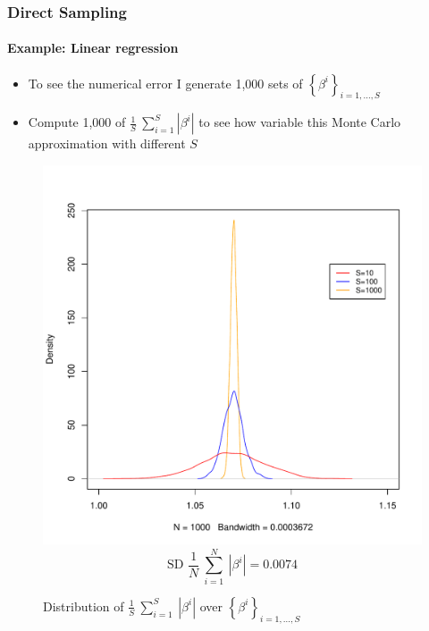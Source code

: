 \documentclass[
  shownotes,
  xcolor={svgnames},
  hyperref={colorlinks,citecolor=DarkBlue,linkcolor=DarkRed,urlcolor=DarkBlue}
  , aspectratio=169]{beamer}
\begin{document}
\begin{frame}[fragile]
\frametitle{Direct Sampling}
\framesubtitle{Example: Linear regression}

\begin{itemize}
\item To see the numerical error I generate 1,000 sets of $\left\{ \beta^{i} \right\}_{i = 1,\ldots,S}$

\item Compute 1,000 of $\frac{1}{S}\ \sum_{i = 1}^{S}\left| \beta^{i} \right|$ to see how variable this Monte Carlo approximation with different $S$

\end{itemize}


  

  \begin{figure}[H] \centering
  \centering
  \caption{Distribution of $\frac{1}{S}\ \sum_{i = 1}^{S}{\ \left| \beta^{i} \right|}$ over $\left\{ \beta^{i} \right\}_{i = 1,\ldots,S}$}
  \includegraphics[scale=0.2]{figures/n1000}
  \\
  \tiny 
  $$\text{SD\ }\frac{1}{N}\ \sum_{i = 1}^{N}{\ \left| \beta^{i} \right|} = 0.0074$$
\end{figure}  




\end{frame}
\end{document}
